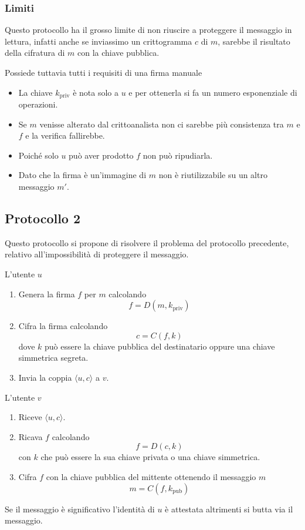 \subsubsection{Limiti}
Questo protocollo ha il grosso limite di non riuscire a proteggere il messaggio in lettura, infatti anche se
inviassimo un crittogramma $c$ di $m$, sarebbe il risultato della cifratura di $m$ con la chiave pubblica.

Possiede tuttavia tutti i requisiti di una firma manuale
\begin{itemize}
	\item La chiave $k_\text{priv}$ \`e nota solo a $u$ e per ottenerla si fa un numero esponenziale di operazioni.
	\item Se $m$ venisse alterato dal crittoanalista non ci sarebbe pi\`u consistenza tra $m$ e $f$ e la verifica
	      fallirebbe.
	\item Poich\'e solo $u$ pu\`o aver prodotto $f$ non pu\`o ripudiarla.
	\item Dato che la firma \`e un'immagine di $m$ non \`e riutilizzabile su un altro messaggio $m'$.
\end{itemize}

\subsection{Protocollo 2}
Questo protocollo si propone di risolvere il problema del protocollo precedente, relativo all'impossibilit\`a di
proteggere il messaggio.

L'utente $u$
\begin{enumerate}
	\item Genera la firma $f$ per $m$ calcolando
	      \[ f = D(m, k_\text{priv}) \]
	\item Cifra la firma calcolando
	      \[ c = C(f, k) \]
	      dove $k$ pu\`o essere la chiave pubblica del destinatario oppure una chiave simmetrica segreta.
	\item Invia la coppia $\langle u, c \rangle$ a $v$.
\end{enumerate}
L'utente $v$
\begin{enumerate}
	\item Riceve $\langle u, c \rangle$.
	\item Ricava $f$ calcolando
	      \[ f = D(c, k) \]
	      con $k$ che pu\`o essere la sua chiave privata o una chiave simmetrica.
	\item Cifra $f$ con la chiave pubblica del mittente ottenendo il messaggio $m$
	      \[ m = C(f, k_\text{pub}) \]
\end{enumerate}
Se il messaggio \`e significativo l'identit\`a di $u$ \`e attestata altrimenti si butta via il messaggio.

